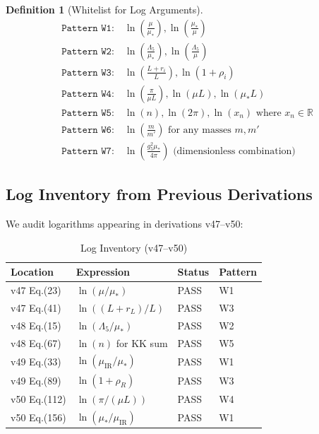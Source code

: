 \documentclass[11pt,a4paper]{article}
\theoremstyle{definition}
\newtheorem{definition}{Definition}[section]
\begin{document}
\begin{definition}[Whitelist for Log Arguments]
\label{def:whitelist}
\begin{align}
\label{eq:wl1}
&\texttt{Pattern W1:} \quad \ln\left(\frac{\mu}{\mu_*}\right), \ln\left(\frac{\mu_*}{\mu}\right) \\
\label{eq:wl2}
&\texttt{Pattern W2:} \quad \ln\left(\frac{\Lambda_5}{\mu_*}\right), \ln\left(\frac{\Lambda_5}{\mu}\right) \\
\label{eq:wl3}
&\texttt{Pattern W3:} \quad \ln\left(\frac{L + r_i}{L}\right), \ln(1 + \rho_i) \\
\label{eq:wl4}
&\texttt{Pattern W4:} \quad \ln\left(\frac{\pi}{\mu L}\right), \ln(\mu L), \ln(\mu_* L) \\
\label{eq:wl5}
&\texttt{Pattern W5:} \quad \ln(n), \ln(2\pi), \ln(x_n) \text{ where } x_n \in \mathbb{R} \\
\label{eq:wl6}
&\texttt{Pattern W6:} \quad \ln\left(\frac{m}{m'}\right) \text{ for any masses } m, m' \\
\label{eq:wl7}
&\texttt{Pattern W7:} \quad \ln\left(\frac{g_5^2 \mu_*}{4\pi}\right) \text{ (dimensionless combination)}
\end{align}
\end{definition}

\subsection{Log Inventory from Previous Derivations}
\label{subsec:log_inventory}

We audit logarithms appearing in derivations v47--v50:

\begin{table}[h]
\centering
\caption{Log Inventory (v47--v50)}
\label{tab:log_inventory}
\begin{tabular}{@{}llll@{}}
\toprule
\textbf{Location} & \textbf{Expression} & \textbf{Status} & \textbf{Pattern} \\
\midrule
v47 Eq.(23) & $\ln(\mu/\mu_*)$ & PASS & W1 \\
v47 Eq.(41) & $\ln((L+r_L)/L)$ & PASS & W3 \\
v48 Eq.(15) & $\ln(\Lambda_5/\mu_*)$ & PASS & W2 \\
v48 Eq.(67) & $\ln(n)$ for KK sum & PASS & W5 \\
v49 Eq.(33) & $\ln(\mu_{\text{IR}}/\mu_*)$ & PASS & W1 \\
v49 Eq.(89) & $\ln(1 + \rho_R)$ & PASS & W3 \\
v50 Eq.(112) & $\ln(\pi/(\mu L))$ & PASS & W4 \\
v50 Eq.(156) & $\ln(\mu_*/\mu_{\text{IR}})$ & PASS & W1 \\
\bottomrule
\end{tabular}
\end{table}
\end{document}
